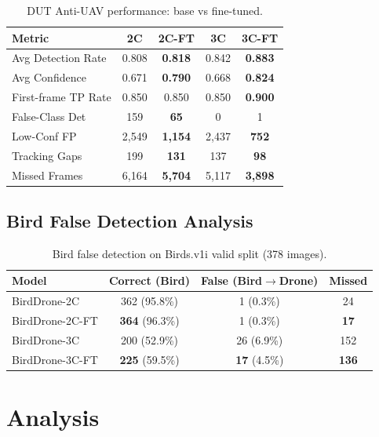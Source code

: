 \documentclass[11pt]{article}
\begin{document}
\begin{table}[H]
\centering
\caption{DUT Anti-UAV performance: base vs fine-tuned.}
\label{tab:dut}
\begin{tabular}{lcccc}
\toprule
\textbf{Metric} & \textbf{2C} & \textbf{2C-FT} & \textbf{3C} & \textbf{3C-FT} \\
\midrule
Avg Detection Rate    & 0.808 & \textbf{0.818} & 0.842 & \textbf{0.883} \\
Avg Confidence        & 0.671 & \textbf{0.790} & 0.668 & \textbf{0.824} \\
First-frame TP Rate   & 0.850 & 0.850 & 0.850 & \textbf{0.900} \\
False-Class Det       & 159   & \textbf{65}    & 0     & 1 \\
Low-Conf FP           & 2,549 & \textbf{1,154} & 2,437 & \textbf{752} \\
Tracking Gaps         & 199   & \textbf{131}   & 137   & \textbf{98} \\
Missed Frames         & 6,164 & \textbf{5,704} & 5,117 & \textbf{3,898} \\
\bottomrule
\end{tabular}
\end{table}

\subsection{Bird False Detection Analysis}
\label{sec:bird_fp}

\begin{table}[H]
\centering
\caption{Bird false detection on Birds.v1i valid split (378 images).}
\label{tab:bird_fp}
\begin{tabular}{lccc}
\toprule
\textbf{Model} & \textbf{Correct (Bird)} & \textbf{False (Bird$\to$Drone)} & \textbf{Missed} \\
\midrule
BirdDrone-2C    & 362 (95.8\%) & 1 (0.3\%)  & 24 \\
BirdDrone-2C-FT & \textbf{364} (96.3\%) & 1 (0.3\%) & \textbf{17} \\
BirdDrone-3C    & 200 (52.9\%) & 26 (6.9\%) & 152 \\
BirdDrone-3C-FT & \textbf{225} (59.5\%) & \textbf{17} (4.5\%) & \textbf{136} \\
\bottomrule
\end{tabular}
\end{table}

\section{Analysis}
\end{document}
